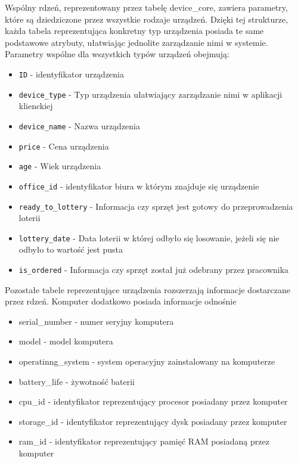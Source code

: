 Wspólny rdzeń, reprezentowany przez tabelę device\_core, zawiera parametry, które są dziedziczone przez wszystkie rodzaje urządzeń. Dzięki tej strukturze, każda tabela reprezentująca konkretny typ urządzenia posiada te same podstawowe atrybuty, ułatwiając jednolite zarządzanie nimi w systemie. Parametry wspólne dla wszystkich typów urządzeń obejmują: 
\begin{itemize}
	\item \texttt{ID} - identyfikator urządzenia
	\item \texttt{device\_type} - Typ urządzenia ułatwiający zarządzanie nimi w aplikacji klienckiej
	\item \texttt{device\_name} - Nazwa urządzenia
	\item \texttt{price} - Cena urządzenia
	\item \texttt{age} - Wiek urządzenia
	\item \texttt{office\_id} - identyfikator biura w którym znajduje się urządzenie
	\item \texttt{ready\_to\_lottery} - Informacja czy sprzęt jest gotowy do przeprowadzenia loterii
	\item \texttt{lottery\_date} - Data loterii w której odbyło się losowanie, jeżeli się nie odbyło to wartość jest pusta
	\item \texttt{is\_ordered} - Informacja czy sprzęt został już odebrany przez pracownika
\end{itemize}

Pozostałe tabele reprezentujące urządzenia rozszerzają informacje dostarczane przez rdzeń. Komputer dodatkowo posiada informacje odnośnie
\begin{itemize} %
	\item serial\_number - numer seryjny komputera
	\item model - model komputera
	\item operatinng\_system - system operacyjny zainstalowany na komputerze
	\item battery\_life - żywotność baterii
	\item cpu\_id - identyfikator reprezentujący procesor posiadany przez komputer
	\item storage\_id - identyfikator reprezentujący dysk posiadany przez komputer
	\item ram\_id - identyfikator reprezentujący pamięć RAM posiadaną przez komputer
\end{itemize}

